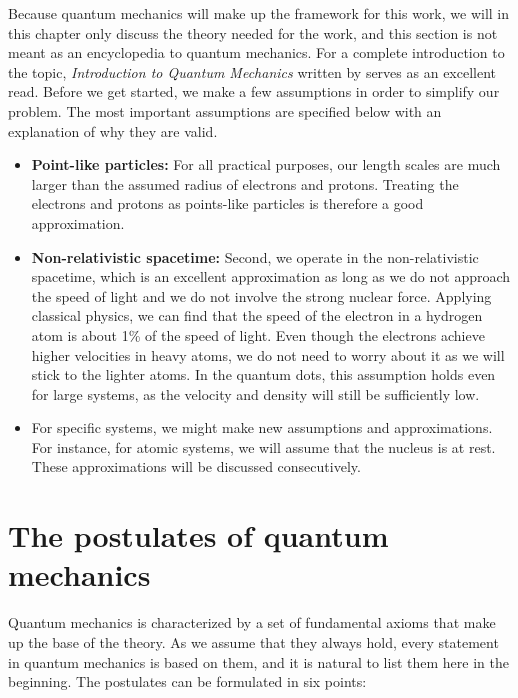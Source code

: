 Because quantum mechanics will make up the framework for this work, we will in this chapter only discuss the theory needed for the work, and this section is not meant as an encyclopedia to quantum mechanics. For a complete introduction to the topic, \textit{Introduction to Quantum Mechanics} written by \citet{griffiths_introduction_2005} serves as an excellent read. Before we get started, we make a few assumptions in order to simplify our problem. The most important assumptions are specified below with an explanation of why they are valid.

\begin{itemize}
	\item \textbf{Point-like particles:} For all practical purposes, our length scales are much larger than the assumed radius of electrons and protons. Treating the electrons and protons as points-like particles is therefore a good approximation. 
	
	\item \textbf{Non-relativistic spacetime:}  Second, we operate in the non-relativistic spacetime, which is an excellent approximation as long as we do not approach the speed of light and we do not involve the strong nuclear force. Applying classical physics, we can find that the speed of the electron in a hydrogen atom is about 1\% of the speed of light. Even though the electrons achieve higher velocities in heavy atoms, we do not need to worry about it as we will stick to the lighter atoms. In the quantum dots, this assumption holds even for large systems, as the velocity and density will still be sufficiently low.
	
	\item For specific systems, we might make new assumptions and approximations. For instance, for atomic systems, we will assume that the nucleus is at rest. These approximations will be discussed consecutively. 
\end{itemize}

\section{The postulates of quantum mechanics} \label{sec:postulates}
Quantum mechanics is characterized by a set of fundamental axioms that make up the base of the theory. As we assume that they always hold, every statement in quantum mechanics is based on them, and it is natural to list them here in the beginning. The postulates can be formulated in six points:

